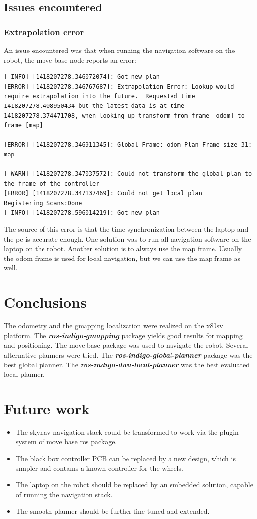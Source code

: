 \documentclass[a4paper]{article}
\newcommand{\rospackage}[1]{\textbf{\textit{ros-indigo-#1}}}
\begin{document}
\subsection{Issues encountered}
\subsubsection{Extrapolation error}
An issue encountered was that when running the navigation software on the robot,
the move-base node reports an error:

\begin{lstlisting}[caption=Error message when running on different pc]
[ INFO] [1418207278.346072074]: Got new plan
[ERROR] [1418207278.346767687]: Extrapolation Error: Lookup would require extrapolation into the future.  Requested time 1418207278.408950434 but the latest data is at time 1418207278.374471708, when looking up transform from frame [odom] to frame [map]

[ERROR] [1418207278.346911345]: Global Frame: odom Plan Frame size 31: map

[ WARN] [1418207278.347037572]: Could not transform the global plan to the frame of the controller
[ERROR] [1418207278.347137469]: Could not get local plan
Registering Scans:Done
[ INFO] [1418207278.596014219]: Got new plan
\end{lstlisting}

The source of this error is that the time synchronization between the laptop and the pc is accurate enough.
One solution was to run all navigation software on the laptop on the robot.
Another solution is to always use the map frame. Usually the odom frame is used for local navigation,
but we can
use the map frame as well.

\section{Conclusions}
The odometry and the gmapping localization were realized on the x80sv platform.
The \rospackage{gmapping} package yields good results for mapping and positioning.
The move-base package was used to navigate the robot. Several alternative planners were
tried. The \rospackage{global-planner} package was the best global planner. The \rospackage{dwa-local-planner}
was the best evaluated local planner.


\section{Future work}

\begin{itemize}
  \item The skynav navigation stack could be transformed to work via the plugin system of
    move base ros package.
  \item The black box controller PCB can be replaced by a new design, which is simpler
    and contains a known controller for the wheels.
  \item The laptop on the robot should be replaced by an embedded solution, capable of
    running the navigation stack.
  \item The smooth-planner should be further fine-tuned and extended.
\end{itemize}
\end{document}
